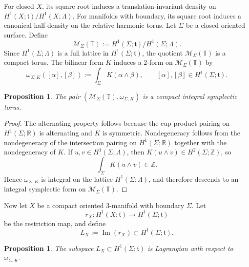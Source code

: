 \documentclass[12pt]{amsart}
\numberwithin{equation}{section}
\newtheorem{prop}[theorem]{Proposition}
\begin{document}
For closed \(X\), its square root induces a translation-invariant density on \(H^1(X;\mathfrak t)/H^1(X;\Lambda)\). For manifolds with boundary, its square root induces
a canonical half-density on the relative harmonic torus. Let \(\Sigma\) be a closed oriented surface. Define
\[
\mathcal M_\Sigma(\mathbb T)
:=
H^1(\Sigma;\mathfrak t)/H^1(\Sigma;\Lambda).
\]
Since \(H^1(\Sigma;\Lambda)\) is a full lattice in \(H^1(\Sigma;\mathfrak t)\),
the quotient \(\mathcal M_\Sigma(\mathbb T)\) is a compact torus. The bilinear form \(K\)
induces a \(2\)-form on \(\mathcal M_\Sigma(\mathbb T)\) by
\begin{equation}
\label{eq:symplectic-form-toral}
\omega_{\Sigma,K}([\alpha],[\beta])
:=
\int_\Sigma K(\alpha\wedge \beta),
\qquad
[\alpha],[\beta]\in H^1(\Sigma;\mathfrak t).
\end{equation}

\begin{prop}
\label{prop:phase-space-toral}
The pair \((\mathcal M_\Sigma(\mathbb T),\omega_{\Sigma,K})\) is a compact integral
symplectic torus.
\end{prop}

\begin{proof}
The alternating property follows because the cup-product pairing on \(H^1(\Sigma;\mathbb R)\) is
alternating and \(K\) is symmetric. Nondegeneracy follows from the nondegeneracy of the
intersection pairing on \(H^1(\Sigma;\mathbb R)\) together with the nondegeneracy of \(K\).
If \(u,v\in H^1(\Sigma;\Lambda)\), then \(K(u\wedge v)\in H^2(\Sigma;\mathbb Z)\), so
\[
\int_\Sigma K(u\wedge v)\in \mathbb Z.
\]
Hence \(\omega_{\Sigma,K}\) is integral on the lattice \(H^1(\Sigma;\Lambda)\), and therefore
descends to an integral symplectic form on \(\mathcal M_\Sigma(\mathbb T)\).
\end{proof}

Now let \(X\) be a compact oriented \(3\)-manifold with boundary \(\Sigma\). Let
\[
r_X\colon H^1(X;\mathfrak t)\longrightarrow H^1(\Sigma;\mathfrak t)
\]
be the restriction map, and define
\begin{equation}
\label{eq:boundary-lagrangian}
L_X:=\operatorname{Im}(r_X)\subset H^1(\Sigma;\mathfrak t).
\end{equation}

\begin{prop}
\label{prop:lagrangian-boundary-data-toral}
The subspace \(L_X\subset H^1(\Sigma;\mathfrak t)\) is Lagrangian with respect to
\(\omega_{\Sigma,K}\).
\end{prop}
\end{document}
